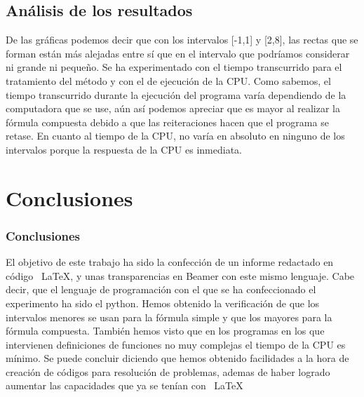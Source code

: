 \documentclass{beamer}
\begin{document}
\subsection{Análisis de los resultados}
\begin{frame}
\begin{block}{}
De las gráficas podemos decir que con los intervalos [-1,1] y [2,8], las rectas que 
se forman están más alejadas entre sí que en el intervalo que podríamos considerar ni grande ni pequeño. 
Se ha experimentado con el tiempo transcurrido para el tratamiento del método y con el de ejecución de la CPU. Como sabemos, el tiempo 
transcurrido durante la ejecución del programa varía dependiendo de la computadora que se use, aún así podemos apreciar que es mayor al realizar la fórmula 
compuesta debido a que las reiteraciones hacen que el programa se retase.
En cuanto al tiempo de la CPU, no varía en absoluto en ninguno de los intervalos porque la respuesta de la CPU es inmediata.
\end{block}


\end{frame}
\section{Conclusiones}

\begin{frame}
\frametitle{Conclusiones}

El objetivo de este trabajo ha sido la confección de un informe redactado en código ~\LaTeX, y unas transparencias en Beamer con este mismo lenguaje. 
Cabe decir, que el lenguaje de programación con el que se ha confeccionado el experimento ha sido el python.
Hemos obtenido la verificación de que los intervalos menores se usan para la fórmula simple y 
que los mayores para la fórmula compuesta.
También hemos visto que en los programas en los que intervienen definiciones de funciones no muy complejas el tiempo de la CPU es mínimo.
Se puede concluir diciendo que hemos obtenido facilidades a la hora de creación de códigos para resolución de problemas, ademas de haber 
logrado aumentar las capacidades que ya se tenían con ~\LaTeX
\end{frame}
\end{document}
